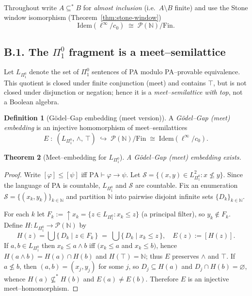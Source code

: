 \documentclass[11pt]{article}
\newtheorem{theorem}{Theorem}[section]
\theoremstyle{definition}
\newtheorem{definition}[theorem]{Definition}
\theoremstyle{remark}
\newcommand{\N}{\mathbb{N}}
\begin{document}
Throughout write $A \subseteq^* B$ for \emph{almost inclusion} (i.e.\ $A \setminus B$ finite) and use the Stone window isomorphism (Theorem~\ref{thm:stone-window})
\[
  \mathrm{Idem}(\ell^\infty/c_0) \;\cong\; \mathcal{P}(\N)/\mathrm{Fin}.
\]

\subsection*{B.1. The $\Pi^0_1$ fragment is a meet--semilattice}

Let $L_{\Pi^0_1}$ denote the set of $\Pi^0_1$ sentences of PA modulo PA--provable equivalence. 
This quotient is closed under finite conjunction (meet) and contains $\top$, but is not closed under disjunction or negation; hence it is a \emph{meet--semilattice with top}, not a Boolean algebra.

\begin{definition}[Gödel--Gap embedding (meet version)]\label{def:godel-gap-meet}
A \emph{Gödel--Gap (meet) embedding} is an injective homomorphism of meet--semilattices
\[
  E \;:\; (L_{\Pi^0_1},\,\wedge,\,\top)\;\hookrightarrow\; \mathcal{P}(\N)/\mathrm{Fin}
  \;\cong\; \mathrm{Idem}(\ell^\infty/c_0).
\]
\end{definition}

\begin{theorem}[Meet--embedding for $L_{\Pi^0_1}$]\label{thm:Pi01-meet-embed}
A Gödel--Gap (meet) embedding exists.
\end{theorem}

\begin{proof}
Write $[\varphi] \le [\psi]$ iff $\mathrm{PA}\vdash \varphi \to \psi$. 
Let $\mathcal{S}=\{(x,y)\in L_{\Pi^0_1}^2 : x\not\le y\}$.
Since the language of PA is countable, $L_{\Pi^0_1}$ and $\mathcal{S}$ are countable.
Fix an enumeration $\mathcal{S}=\{(x_k,y_k)\}_{k\in\N}$ and partition $\N$ into pairwise disjoint infinite sets $\{D_k\}_{k\in\N}$.

For each $k$ let $F_k:=\uparrow x_k=\{z\in L_{\Pi^0_1}:x_k\le z\}$ (a principal filter), so $y_k\notin F_k$.
Define $H:L_{\Pi^0_1}\to\mathcal{P}(\N)$ by
\[
  H(z)=\bigcup\{\,D_k \mid z\in F_k\,\}
  \;=\; \bigcup\{\,D_k \mid x_k \le z\,\},
  \quad E(z):=[H(z)].
\]
If $a,b\in L_{\Pi^0_1}$ then $x_k\le a\wedge b$ iff $(x_k\le a$ and $x_k\le b)$, hence $H(a\wedge b)=H(a)\cap H(b)$ and $H(\top)=\N$; thus $E$ preserves $\wedge$ and $\top$.
If $a\not\le b$, then $(a,b)=(x_j,y_j)$ for some $j$, so $D_j\subseteq H(a)$ and $D_j\cap H(b)=\varnothing$, whence $H(a)\not\subseteq^* H(b)$ and $E(a)\ne E(b)$.
Therefore $E$ is an injective meet--homomorphism.
\end{proof}
\end{document}
